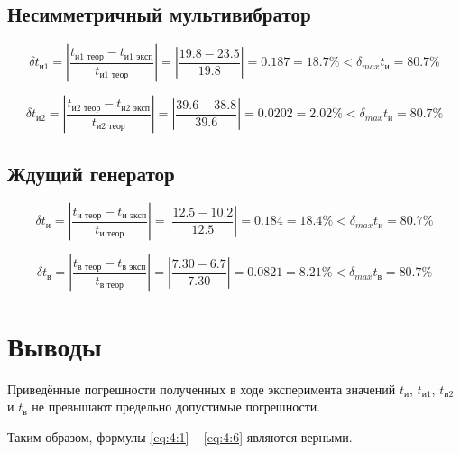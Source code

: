 \subsection{Несимметричный мультивибратор}

\begin{displaymath}
	\delta t_{\text{и1}} = \left| \frac{t_{\text{и1 теор}} - t_{\text{и1 эксп}}}{t_{\text{и1 теор}}} \right| = \left| \frac{19.8 - 23.5}{19.8} \right| = 0.187 = 18.7 \% < \delta_{max} t_{\text{и}} = 80.7 \%
\end{displaymath}

\begin{displaymath}
	\delta t_{\text{и2}} = \left| \frac{t_{\text{и2 теор}} - t_{\text{и2 эксп}}}{t_{\text{и2 теор}}} \right| = \left| \frac{39.6 - 38.8}{39.6} \right| = 0.0202 = 2.02 \% < \delta_{max} t_{\text{и}} = 80.7 \%
\end{displaymath}

\subsection{Ждущий генератор}

\begin{displaymath}
	\delta t_{\text{и}} = \left| \frac{t_{\text{и теор}} - t_{\text{и эксп}}}{t_{\text{и теор}}} \right| = \left| \frac{12.5 - 10.2}{12.5} \right| = 0.184 = 18.4 \% < \delta_{max} t_{\text{и}} = 80.7 \%
\end{displaymath}

\begin{displaymath}
	\delta t_{\text{в}} = \left| \frac{t_{\text{в теор}} - t_{\text{в эксп}}}{t_{\text{в теор}}} \right| = \left| \frac{7.30 - 6.7}{7.30} \right| = 0.0821 = 8.21 \% < \delta_{max} t_{\text{в}} = 80.7 \%
\end{displaymath}

\section{Выводы}

Приведённые погрешности полученных в ходе эксперимента значений $t_{\text{и}}$, $t_{\text{и1}}$, $t_{\text{и2}}$ и $t_{\text{в}}$ не превышают предельно допустимые погрешности.

Таким образом, формулы \ref{eq:4:1} -- \ref{eq:4:6} являются верными.

